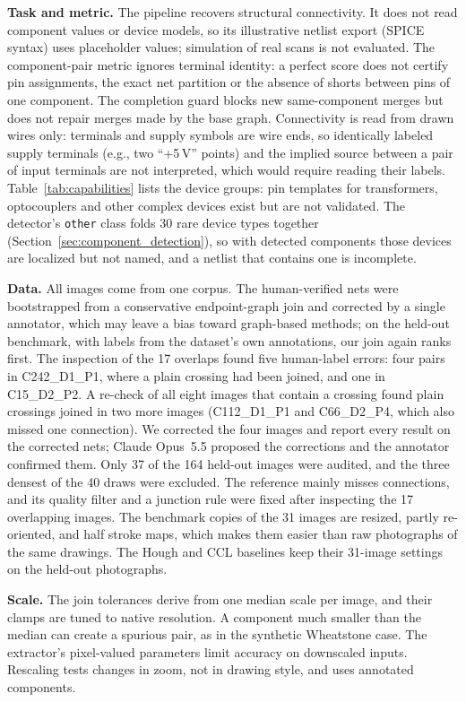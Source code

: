 \documentclass{ieeeaccess}
\begin{document}
\textbf{Task and metric.} The pipeline recovers structural connectivity. It does not read component values or device models, so its illustrative netlist export (SPICE syntax) uses placeholder values; simulation of real scans is not evaluated. The component-pair metric ignores terminal identity: a perfect score does not certify pin assignments, the exact net partition or the absence of shorts between pins of one component. The completion guard blocks new same-component merges but does not repair merges made by the base graph. Connectivity is read from drawn wires only: terminals and supply symbols are wire ends, so identically labeled supply terminals (e.g., two ``+5\,V'' points) and the implied source between a pair of input terminals are not interpreted, which would require reading their labels. Table~\ref{tab:capabilities} lists the device groups: pin templates for transformers, optocouplers and other complex devices exist but are not validated. The detector's \texttt{other} class folds 30 rare device types together (Section~\ref{sec:component_detection}), so with detected components those devices are localized but not named, and a netlist that contains one is incomplete.

\textbf{Data.} All images come from one corpus. The human-verified nets were bootstrapped from a conservative endpoint-graph join and corrected by a single annotator, which may leave a bias toward graph-based methods; on the held-out benchmark, with labels from the dataset's own annotations, our join again ranks first. The inspection of the 17 overlaps found five human-label errors: four pairs in C242\_D1\_P1, where a plain crossing had been joined, and one in C15\_D2\_P2. A re-check of all eight images that contain a crossing found plain crossings joined in two more images (C112\_D1\_P1 and C66\_D2\_P4, which also missed one connection). We corrected the four images and report every result on the corrected nets; Claude Opus~5.5 proposed the corrections and the annotator confirmed them. Only 37 of the 164 held-out images were audited, and the three densest of the 40 draws were excluded. The reference mainly misses connections, and its quality filter and a junction rule were fixed after inspecting the 17 overlapping images. The benchmark copies of the 31 images are resized, partly re-oriented, and half stroke maps, which makes them easier than raw photographs of the same drawings. The Hough and CCL baselines keep their 31-image settings on the held-out photographs.

\textbf{Scale.} The join tolerances derive from one median scale per image, and their clamps are tuned to native resolution. A component much smaller than the median can create a spurious pair, as in the synthetic Wheatstone case. The extractor's pixel-valued parameters limit accuracy on downscaled inputs. Rescaling tests changes in zoom, not in drawing style, and uses annotated components.
\end{document}
